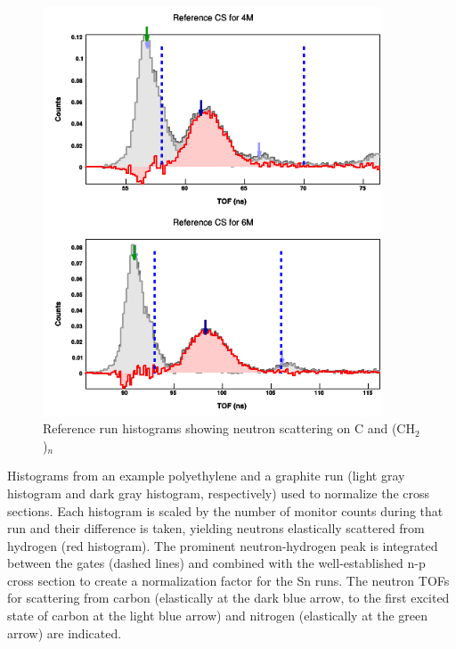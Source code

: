 \begin{figure}
    \includegraphics[width = 0.9\textwidth]{figures/polyethyleneRef.png}
    \caption{Reference run histograms showing neutron scattering on C and (CH$_{2}$)$_{n}$}
    \label{polyethyleneRef}
\end{figure}

Histograms from an example polyethylene and a graphite run (light gray
histogram and dark gray histogram, respectively) used to normalize the
cross sections. Each histogram is scaled by the number of monitor counts during
that run and their difference is taken, yielding neutrons elastically scattered
from hydrogen (red histogram). The prominent neutron-hydrogen peak is
integrated between the gates (dashed lines) and combined with the
well-established n-p cross section to create a normalization factor for
the Sn runs. The neutron TOFs for scattering from carbon (elastically at the dark blue
arrow, to the first excited state of carbon at the light blue arrow)
and nitrogen (elastically at the green arrow) are indicated.

